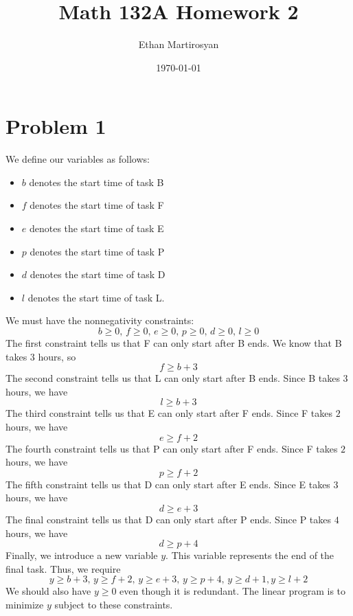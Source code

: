 \documentclass[12pt]{article}
\begin{document}
 
\title{Math 132A Homework 2}
\author{Ethan Martirosyan}
\date{\today}
\maketitle
{}
\hfuzz=50pt
\section*{Problem 1}
We define our variables as follows:
\begin{itemize}
\item $b$ denotes the start time of task B
\item $f$ denotes the start time of task F
\item $e$ denotes the start time of task E
\item $p$ denotes the start time of task P
\item $d$ denotes the start time of task D
\item $l$ denotes the start time of task L.
\end{itemize}
We must have the nonnegativity constraints:
\[
b \geq 0,\, f \geq 0,\, e \geq 0,\, p \geq 0,\, d \geq 0,\, l \geq 0
\] The first constraint tells us that F can only start after B ends. We know that B takes $3$ hours, so
\[
f \geq b + 3
\] The second constraint tells us that L can only start after B ends. Since B takes $3$ hours, we have
\[
l \geq b + 3
\] The third constraint tells us that E can only start after F ends. Since F takes $2$ hours, we have 
\[
e \geq f+2
\] The fourth constraint tells us that P can only start after F ends. Since F takes $2$ hours, we have
\[
p \geq f+2
\] The fifth constraint tells us that D can only start after E ends. Since E takes $3$ hours, we have
\[
d \geq e + 3
\] The final constraint tells us that D can only start after P ends. Since P takes $4$ hours, we have
\[
d \geq p + 4
\] Finally, we introduce a new variable $y$. This variable represents the end of the final task. Thus, we require
\[
y \geq b+3,\, y\geq f+2,\, y \geq e+3,\, y \geq p +4,\, y \geq d+1, y \geq l+2
\] We should also have $y \geq 0$ even though it is redundant. The linear program is to minimize $y$ subject to these constraints.
\end{document}
